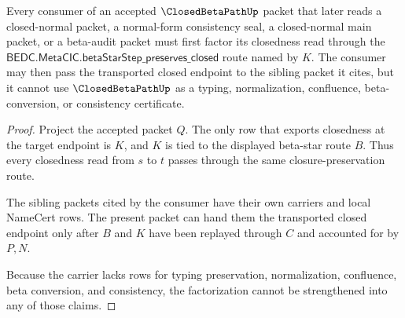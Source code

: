 \begin{theorem}
\label{thm:closed-beta-path-closure-preservation-factorization}
Every consumer of an accepted $\ClosedBetaPathUp$ packet that later reads a
closed-normal packet, a normal-form consistency seal, a closed-normal main
packet, or a beta-audit packet must first factor its closedness read through
the $\mathsf{BEDC.MetaCIC.betaStarStep\_preserves\_closed}$ route named by
$K$. The consumer may then pass the transported closed endpoint to the sibling
packet it cites, but it cannot use $\ClosedBetaPathUp$ as a typing,
normalization, confluence, beta-conversion, or consistency certificate.
\end{theorem}
\begin{proof}
Project the accepted packet $Q$. The only row that exports closedness at the
target endpoint is $K$, and $K$ is tied to the displayed beta-star route $B$.
Thus every closedness read from $s$ to $t$ passes through the same
closure-preservation route.

The sibling packets cited by the consumer have their own carriers and local
NameCert rows. The present packet can hand them the transported closed endpoint
only after $B$ and $K$ have been replayed through $C$ and accounted for by
$P,N$.

Because the carrier lacks rows for typing preservation, normalization,
confluence, beta conversion, and consistency, the factorization cannot be
strengthened into any of those claims.
\end{proof}


\begin{closurestatus}{\ClosedBetaPathUp}
  \theoryclosure{\obligationClosure}
  \formalstatus{\theoremCheckedV}
\end{closurestatus}
